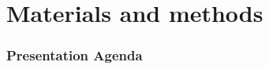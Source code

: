\section{Materials and methods}
\begin{frame}
\frametitle{Presentation Agenda}
\tableofcontents[currentsection]
\end{frame}
